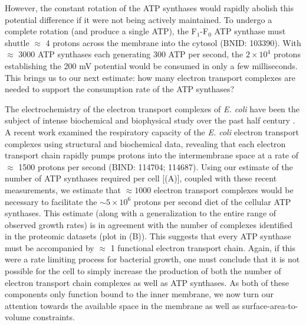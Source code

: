 However, the constant rotation of the ATP synthases would rapidly abolish
this potential difference if it were not being actively maintained. To
undergo a complete rotation (and produce a single ATP), the F$_1$-F$_0$ ATP
synthase must shuttle $\approx$ 4 protons across the membrane into the
cytosol (BNID: 103390). With $\approx$ 3000 ATP synthases each
generating 300 ATP per second, the $2 \times 10^4$ protons establishing the 200
mV potential would be consumed in only a few milliseconds. This brings us
to our next estimate: how many electron transport complexes are needed to
support the consumption rate of the ATP synthases?

The electrochemistry of the electron transport complexes of \textit{E. coli}
have been the subject of intense biochemical and biophysical study over the past
half century \citep{ingledew1984, khademian2017,cox1970,henkel2014}. A recent
work \citep{szenk2017} examined the respiratory capacity of the \textit{E. coli}
electron transport complexes using structural and biochemical data, revealing
that each electron transport chain rapidly pumps protons into the intermembrane
space at a rate of $\approx$ 1500 protons per second (BIND: 114704; 114687). Using our estimate of the number of ATP synthases required per
cell [(A)], coupled with these recent measurements, we
estimate that $\approx 1000$ electron transport complexes would be necessary to
facilitate the $\sim 5 \times 10^6$ protons per second diet of the cellular
ATP synthases. This estimate (along with a generalization to the entire range of
observed growth rates) is in agreement with the number of complexes
identified in the proteomic datasets (plot in (B)). This
suggests that every ATP synthase must be accompanied by $\approx$ 1 functional
electron transport chain. Again, if this were a rate limiting process for
bacterial growth, one must conclude that it is not possible for the cell to
simply increase the production of both the number of electron transport chain
complexes as well as ATP synthases. As both of these components only function
bound to the inner membrane, we now turn our attention towards the available
space in the membrane as well as surface-area-to-volume constraints.


